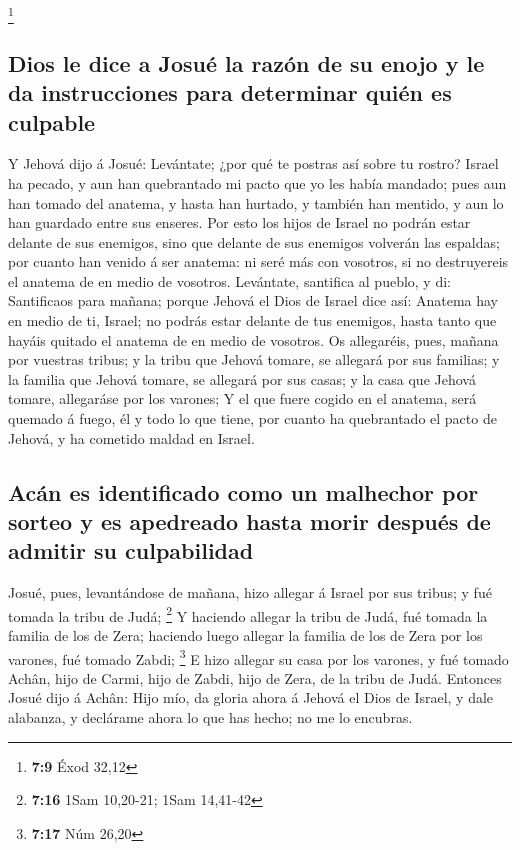 \footnote{\textbf{7:9} Éxod 32,12}

\hypertarget{dios-le-dice-a-josuuxe9-la-razuxf3n-de-su-enojo-y-le-da-instrucciones-para-determinar-quiuxe9n-es-culpable}{%
\subsection{Dios le dice a Josué la razón de su enojo y le da
instrucciones para determinar quién es
culpable}\label{dios-le-dice-a-josuuxe9-la-razuxf3n-de-su-enojo-y-le-da-instrucciones-para-determinar-quiuxe9n-es-culpable}}

 Y Jehová dijo á Josué: Levántate; ¿por qué te postras
así sobre tu rostro?  Israel ha pecado, y aun han
quebrantado mi pacto que yo les había mandado; pues aun han tomado del
anatema, y hasta han hurtado, y también han mentido, y aun lo han
guardado entre sus enseres.  Por esto los hijos de Israel
no podrán estar delante de sus enemigos, sino que delante de sus
enemigos volverán las espaldas; por cuanto han venido á ser anatema: ni
seré más con vosotros, si no destruyereis el anatema de en medio de
vosotros.  Levántate, santifica al pueblo, y di:
Santificaos para mañana; porque Jehová el Dios de Israel dice así:
Anatema hay en medio de ti, Israel; no podrás estar delante de tus
enemigos, hasta tanto que hayáis quitado el anatema de en medio de
vosotros.  Os allegaréis, pues, mañana por vuestras
tribus; y la tribu que Jehová tomare, se allegará por sus familias; y la
familia que Jehová tomare, se allegará por sus casas; y la casa que
Jehová tomare, allegaráse por los varones;  Y el que
fuere cogido en el anatema, será quemado á fuego, él y todo lo que
tiene, por cuanto ha quebrantado el pacto de Jehová, y ha cometido
maldad en Israel.

\hypertarget{acuxe1n-es-identificado-como-un-malhechor-por-sorteo-y-es-apedreado-hasta-morir-despuuxe9s-de-admitir-su-culpabilidad}{%
\subsection{Acán es identificado como un malhechor por sorteo y es
apedreado hasta morir después de admitir su
culpabilidad}\label{acuxe1n-es-identificado-como-un-malhechor-por-sorteo-y-es-apedreado-hasta-morir-despuuxe9s-de-admitir-su-culpabilidad}}

 Josué, pues, levantándose de mañana, hizo allegar á
Israel por sus tribus; y fué tomada la tribu de Judá; \footnote{\textbf{7:16}
  1Sam 10,20-21; 1Sam 14,41-42}  Y haciendo allegar la
tribu de Judá, fué tomada la familia de los de Zera; haciendo luego
allegar la familia de los de Zera por los varones, fué tomado Zabdi;
\footnote{\textbf{7:17} Núm 26,20}  E hizo allegar su
casa por los varones, y fué tomado Achân, hijo de Carmi, hijo de Zabdi,
hijo de Zera, de la tribu de Judá.  Entonces Josué dijo á
Achân: Hijo mío, da gloria ahora á Jehová el Dios de Israel, y dale
alabanza, y declárame ahora lo que has hecho; no me lo encubras.

